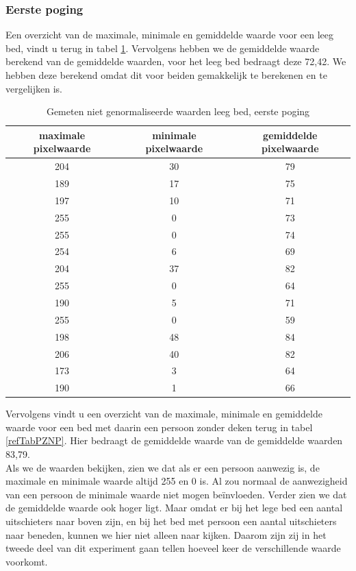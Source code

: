 \subsubsection{Eerste poging} 
Een overzicht van de maximale, minimale en gemiddelde waarde voor een leeg bed, vindt u terug in tabel \ref{refTabPZNL}. Vervolgens hebben we de gemiddelde waarde berekend van de gemiddelde waarden, voor het leeg bed bedraagt deze 72,42. We hebben deze berekend omdat dit voor beiden gemakkelijk te berekenen en te vergelijken is. 

\begin{table}[hbp]
	\begin{tabular}{|c|c|c|}
		\hline
		maximale pixelwaarde & minimale pixelwaarde & gemiddelde pixelwaarde \\ \hline
		204 & 30 & 79 \\ \hline
		189 & 17 & 75 \\ \hline
		197 & 10 & 71 \\ \hline
		255 & 0 & 73 \\ \hline
		255 & 0 & 74 \\ \hline
		254 & 6 & 69 \\ \hline
		204 & 37 & 82 \\ \hline
		255 & 0 & 64 \\ \hline
		190 & 5 & 71 \\ \hline
		255 & 0 & 59 \\ \hline
		198 & 48 & 84 \\ \hline
		206 & 40 & 82 \\ \hline
		173 & 3 & 64 \\ \hline
		190 & 1 & 66 \\ \hline
        
	\end{tabular}
	\caption{Gemeten niet genormaliseerde waarden leeg bed, eerste poging}
	\label{refTabPZNL}
\end{table}
Vervolgens vindt u een overzicht van de maximale, minimale en gemiddelde waarde voor een bed met daarin een persoon zonder deken terug in tabel \ref{refTabPZNP}. Hier bedraagt de gemiddelde waarde van de gemiddelde waarden 83,79. \\
Als we de waarden bekijken, zien we dat als er een persoon aanwezig is, de maximale en minimale waarde altijd 255 en 0 is. Al zou normaal de aanwezigheid van een persoon de minimale waarde niet mogen be\"invloeden. Verder zien we dat de gemiddelde waarde ook hoger ligt. Maar omdat er bij het lege bed een aantal uitschieters naar boven zijn, en bij het bed met persoon een aantal uitschieters naar beneden, kunnen we hier niet alleen naar kijken. Daarom zijn zij in het tweede deel van dit experiment gaan tellen hoeveel keer de verschillende waarde voorkomt.


